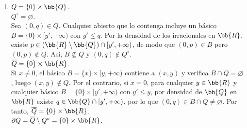 \documentclass[12pt]{article}
\begin{document}
\begin{ejercicio}
\begin{enumerate}[label=\alph*)]
\begin{enumerate}
\begin{center}
        \end{center}
        
        \item $Q = \{0\} \times \bb{Q}$.\\
        $Q^{\circ} = \varnothing$.\\
        Sea $(0, q) \in Q$. Cualquier abierto que lo contenga incluye un básico $B = \{0\} \times [y', +\infty)$ con $y' \leq q$. Por la densidad de los irracionales en $\bb{R}$, existe $p \in (\bb{R} \setminus \bb{Q}) \cap [y', +\infty)$, de modo que $(0, p) \in B$ pero $(0, p) \notin Q$. Así, $B \not\subseteq Q$ y $(0, q) \notin Q^{\circ}$.\\

        $\overline{Q} = \{0\} \times \bb{R}$.\\
        Si $x \neq 0$, el básico $B = \{x\} \times [y, +\infty)$ contiene a $(x, y)$ y verifica $B \cap Q = \varnothing$, luego $(x, y) \notin \overline{Q}$. Por el contrario, si $x = 0$, para cualquier $y \in \bb{R}$ y cualquier básico $B = \{0\} \times [y', +\infty)$ con $y' \leq y$, por densidad de $\bb{Q}$ en $\bb{R}$ existe $q \in \bb{Q} \cap [y', +\infty)$, por lo que $(0, q) \in B \cap Q \neq \varnothing$. Por tanto, $\overline{Q} = \{0\} \times \bb{R}$.\\

        $\partial Q = \overline{Q} \setminus Q^{\circ} = \{0\} \times \bb{R}$.
        \begin{center}
        \end{center}


\end{enumerate}
\end{enumerate}
\end{ejercicio}
\end{document}
